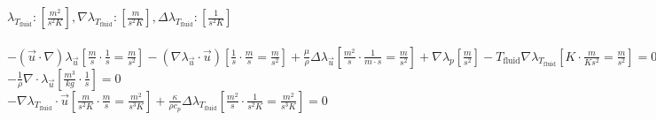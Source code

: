 \documentclass[10pt]{article} %
\begin{document}
\begin{center}
	$\lambda_{T_{\text{fluid}}}: \left[ \frac{m^2}{s^2K} \right], \nabla \lambda_{T_{\text{fluid}}}: \left[ \frac{m}{s^2 K} \right], \Delta \lambda_{T_{\text{fluid}}}: \left[ \frac{1}{s^2 K} \right]$\\
	\quad\\
	$-(\vec{u}\cdot\nabla) \lambda_{\vec{u}} \left[ \frac{m}{s} \cdot \frac{1}{s} = \frac{m}{s^2} \right] - \left(\nabla \lambda_{\vec{u}} \cdot \vec{u}\right) \left[ \frac{1}{s} \cdot \frac{m}{s} = \frac{m}{s^2} \right] + \frac{\mu}{\rho} \Delta \lambda_{\vec{u}}  \left[ \frac{m^2}{s} \cdot \frac{1}{m\cdot s} = \frac{m}{s^2}\right] + \nabla\lambda_p \left[ \frac{m}{s^2} \right] - T_{\text{fluid}} \nabla \lambda_{T_{\text{fluid}}} \left[K \cdot \frac{m}{K s^2} = \frac{m}{s^2} \right] = 0$\\
	$-\frac{1}{\rho} \nabla \cdot \lambda_{\vec{u}} \left[ \frac{m^3}{kg} \cdot \frac{1}{s} \right] = 0$\\
	$-\nabla \lambda_{T_{\text{fluid}}} \cdot \vec{u} \left[\frac{m}{s^2K}  \cdot \frac{m}{s}= \frac{m^2}{s^3 K}\right] + \frac{\kappa}{\rho c_p} \Delta  \lambda_{T_{\text{fluid}}}\left[ \frac{m^2}{s} \cdot \frac{1}{s^2 K} = \frac{m^2}{s^3 K}\right] = 0$\\
	

\end{center}
\newpage
\end{document}
